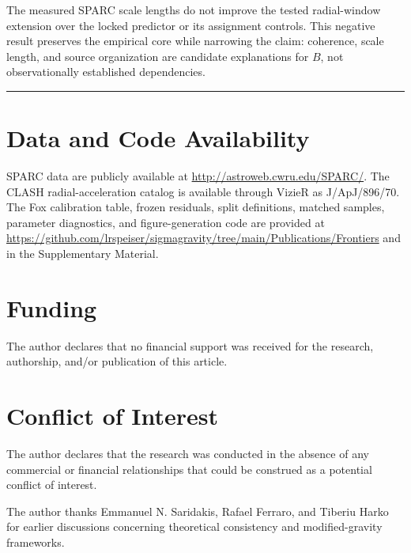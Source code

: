 \documentclass[aps,prd,reprint,superscriptaddress,showpacs,floatfix,longbibliography]{revtex4-2}
\begin{document}
The measured SPARC scale lengths do not improve the tested radial-window extension over the locked predictor or its assignment controls. This negative result preserves the empirical core while narrowing the claim: coherence, scale length, and source organization are candidate explanations for $B$, not observationally established dependencies.

\medskip\hrule\medskip

\section{Data and Code Availability}

SPARC data are publicly available at \url{http://astroweb.cwru.edu/SPARC/}. The CLASH radial-acceleration catalog is available through VizieR as J/ApJ/896/70. The Fox calibration table, frozen residuals, split definitions, matched samples, parameter diagnostics, and figure-generation code are provided at \url{https://github.com/lrspeiser/sigmagravity/tree/main/Publications/Frontiers} and in the Supplementary Material.

\section{Funding}

The author declares that no financial support was received for the research, authorship, and/or publication of this article.

\section{Conflict of Interest}

The author declares that the research was conducted in the absence of any commercial or financial relationships that could be construed as a potential conflict of interest.

\begin{acknowledgments}
The author thanks Emmanuel N. Saridakis, Rafael Ferraro, and Tiberiu Harko for earlier discussions concerning theoretical consistency and modified-gravity frameworks.
\end{acknowledgments}
\end{document}
